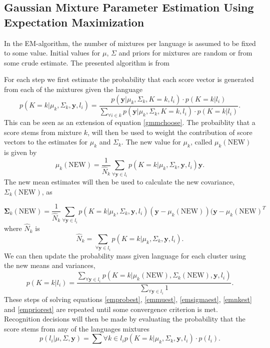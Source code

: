 \subsection{Gaussian Mixture Parameter Estimation Using Expectation Maximization}
\label{sect:emgmmest}

In the EM-algorithm, the number of mixtures per language is assumed to be fixed to some value. Initial values for $\mu$, $\Sigma$ and priors for mixtures are random or from some crude estimate. The presented algorithm is from \cite[o. 439]{machinelearningbook}

For each step we first estimate the probability that each score vector is generated from each of the mixtures given the language 
\begin{equation}
\label{emprobest}
p(K=k | \mu_k, \Sigma_k, \mathbf{y}, l_i) = \frac{p(\mathbf{y} | \mu_k, \Sigma_k, K=k, l_i)\cdot p(K=k | l_i)}{\sum_{\forall i \in k}
p(\mathbf{y} | \mu_k, \Sigma_k, K=k, l_i)\cdot p(K=k | l_i)}.
\end{equation}
This can be seen as an extension of equation \ref{gmmchoose}. The probaiblity that a score stems from mixture $k$,  will then be used to weight the contribution of score vectors to the estimates for $\mu_k$ and $\Sigma_k$. The new value for $\mu_k$, called $\mu_k(\text{NEW})$ is given by
\begin{equation}
\label{emmuest}
\mu_k(\text{NEW}) = \frac{1}{\hat{N}_k}\sum_{\forall \mathbf{y} \in l_i} p(K=k | \mu_k, \Sigma_k, \mathbf{y}, l_i)\mathbf{y}.
\end{equation}
The new mean estimates will then be used to calculate the new covariance, $\Sigma_k(\text{NEW})$, as

\begin{equation}
\label{emsigmaest}
\mathbf{\Sigma}_k(\text{NEW}) = \frac{1}{\hat{N}_k}\sum_{\forall \mathbf{y} \in l_i} p(K=k | \mu_k, \Sigma_k, \mathbf{y}, l_i)(\mathbf{y}-\mu_k(\text{NEW}))(\mathbf{y}-\mu_k(\text{NEW})^T
\end{equation}
where $\hat{N}_k$ is 
\begin{equation}
\label{emnkest}
\hat{N}_k = \sum_{\forall \mathbf{y} \in l_i} p(K=k | \mu_k, \Sigma_k, \mathbf{y}, l_i).
\end{equation}
We can then update the probability mass given language for each cluster using the new means and variances,
\begin{equation}
\label{empriorest}
p(K=k | l_i) = \frac{\sum_{\forall \mathbf{y} \in l_i}p(K=k | \mu_k(\text{NEW}), \Sigma_k(\text{NEW}), \mathbf{y}, l_i)}{\sum_{\forall \mathbf{y} \in l_i} 1}.
\end{equation}
These steps of solving equations \ref{emprobest}, \ref{emmuest}, \ref{emsigmaest}, \ref{emnkest} and \ref{empriorest} are repeated until some convergence criterion is met. Recognition decisions will then be made by evaluating the probability that the score stems from any of the languages mixtures
\begin{equation}
\label{emgmmchoose}
p(l_i | \mu, \Sigma, \mathbf{y}) = \sum{\forall k \in l_i} p(K=k | \mu_k, \Sigma_k, \mathbf{y}, l_i)\cdot p(l_i).
\end{equation}

